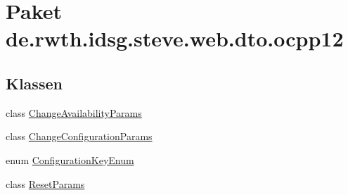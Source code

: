 \hypertarget{namespacede_1_1rwth_1_1idsg_1_1steve_1_1web_1_1dto_1_1ocpp12}{\section{Paket de.\+rwth.\+idsg.\+steve.\+web.\+dto.\+ocpp12}
\label{namespacede_1_1rwth_1_1idsg_1_1steve_1_1web_1_1dto_1_1ocpp12}
}
\subsection*{Klassen}
\begin{DoxyCompactItemize}
\item 
class \hyperlink{classde_1_1rwth_1_1idsg_1_1steve_1_1web_1_1dto_1_1ocpp12_1_1_change_availability_params}{Change\+Availability\+Params}
\item 
class \hyperlink{classde_1_1rwth_1_1idsg_1_1steve_1_1web_1_1dto_1_1ocpp12_1_1_change_configuration_params}{Change\+Configuration\+Params}
\item 
enum \hyperlink{enumde_1_1rwth_1_1idsg_1_1steve_1_1web_1_1dto_1_1ocpp12_1_1_configuration_key_enum}{Configuration\+Key\+Enum}
\item 
class \hyperlink{classde_1_1rwth_1_1idsg_1_1steve_1_1web_1_1dto_1_1ocpp12_1_1_reset_params}{Reset\+Params}
\end{DoxyCompactItemize}
